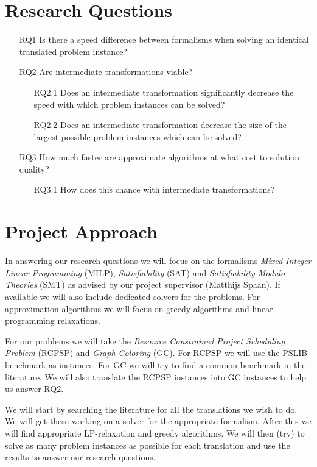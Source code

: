 \documentclass{sig-alternate}
\begin{document}
\section{Research Questions}

\begin{enumerate}
\item[RQ1]{Is there a speed difference between formalisms when solving an identical translated problem instance?}
\item[RQ2]{Are intermediate transformations viable?}
	\begin{enumerate}
	\item[RQ2.1]{Does an intermediate transformation significantly decrease the speed with which problem instances can be solved?}
	\item[RQ2.2]{Does an intermediate transformation decrease the size of the largest possible problem instances which can be solved?}
	\end{enumerate}
\item[RQ3]{How much faster are approximate algorithms at what cost to solution quality?}
	\begin{enumerate}
	\item[RQ3.1]{How does this chance with intermediate transformations?}
	\end{enumerate}
\end{enumerate}


\section{Project Approach}

In answering our research questions we will focus on the formalisms \emph{Mixed Integer Linear Programming} (MILP), \emph{Satisfiability} (SAT) and \emph{Satisfiability Modulo Theories} (SMT) as advised by our project supervisor (Matthijs Spaan).
If available we will also include dedicated solvers for the problems.
For approximation algorithms we will focus on greedy algorithms and linear programming relaxations.

For our problems we will take the \emph{Resource Constrained Project Scheduling Problem} (RCPSP) and \emph{Graph Coloring} (GC).
For RCPSP we will use the PSLIB benchmark as instances.
For GC we will try to find a common benchmark in the literature.
We will also translate the RCPSP instances into GC instances to help us answer RQ2.

We will start by searching the literature for all the translations we wish to do.
We will get these working on a solver for the appropriate formalism.
After this we will find appropriate LP-relaxation and greedy algorithms.
We will then (try) to solve as many problem instances as possible for each translation and use the results to answer our research questions.
\end{document}
